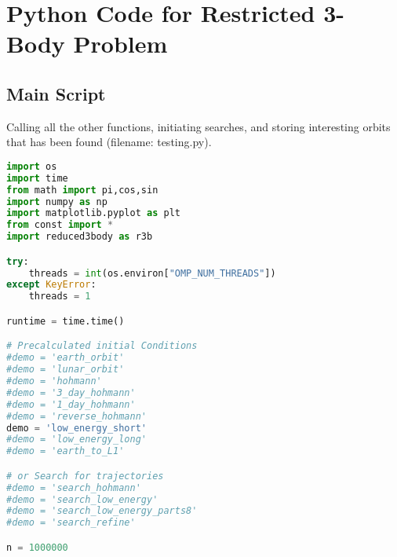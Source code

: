 \chapter{Python Code for Restricted 3-Body Problem} \label{app:code-r3b}
\section{Main Script} \label{app:code-testing}
Calling all the other functions, initiating searches, and storing interesting orbits that has been found (filename: testing.py).
\begin{adjustwidth*}{0cm}{-0.4cm}
\begin{lstlisting}[language=Python]
import os
import time
from math import pi,cos,sin
import numpy as np
import matplotlib.pyplot as plt
from const import *
import reduced3body as r3b

try:  
    threads = int(os.environ["OMP_NUM_THREADS"])
except KeyError: 
    threads = 1

runtime = time.time()

# Precalculated initial Conditions
#demo = 'earth_orbit'
#demo = 'lunar_orbit'
#demo = 'hohmann'
#demo = '3_day_hohmann'
#demo = '1_day_hohmann'
#demo = 'reverse_hohmann'
demo = 'low_energy_short'
#demo = 'low_energy_long'
#demo = 'earth_to_L1'

# or Search for trajectories
#demo = 'search_hohmann'
#demo = 'search_low_energy'
#demo = 'search_low_energy_parts8'
#demo = 'search_refine'

n = 1000000


\end{lstlisting}
\end{adjustwidth*}
